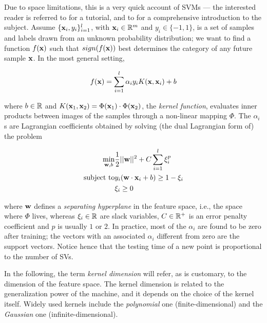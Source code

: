 Due to space limitations, this is a very quick account of SVMs --- the
interested reader is referred to \cite{Burges98} for a tutorial, and
to \cite{Cristianini00} for a comprehensive introduction to the
subject. Assume $\{\mathbf{x}_i,y_i\}_{i=1}^l$, with $\mathbf{x}_i \in \mathbb{R}^m$ and
$y_i \in \{-1,1\}$, is a set of samples and labels drawn from an
unknown probability distribution; we want to find a function $f(\mathbf{x})$
such that $sign(f(\mathbf{x}))$ best determines the category of any future
sample $\mathbf{x}$. In the most general setting,

\begin{equation} \label{eqn:sol}
  f(\mathbf{x}) = \sum_{i=1}^l \alpha_i y_i K(\mathbf{x},\mathbf{x}_i) + b
\end{equation}

\noindent where $b \in \mathbb{R}$ and $K(\mathbf{x}_1,\mathbf{x}_2) = \Phi(\mathbf{x}_1)
\cdot \Phi(\mathbf{x}_2)$, the \emph{kernel function}, evaluates inner
products between images of the samples through a non-linear mapping
$\Phi$. The $\alpha_i$s are Lagrangian coefficients obtained by
solving (the dual Lagrangian form of) the problem

\begin{eqnarray} \label{eqn:svm_primal}
  \min_{\mathbf{w},b}      & \frac{1}{2} ||\mathbf{w}||^2 + C \sum_{i=1}^l \xi_i^p \\
  \mbox{subject to} & y_i (\mathbf{w}\cdot\mathbf{x}_i + b) \geq 1-\xi_i            \nonumber \\
                    & \xi_i \geq 0                                    \nonumber
\end{eqnarray}

\noindent where $\mathbf{w}$ defines a \emph{separating hyperplane}
in the feature space, i.e., the space where $\Phi$ lives, whereas
$\xi_i \in \mathbb{R}$ are slack variables, $C \in \mathbb{R}^+$ is an error penalty
coefficient and $p$ is usually $1$ or $2$. In practice, most of the
$\alpha_i$ are found to be zero after training; the vectors with an
associated $\alpha_i$ different from zero are the support
vectors. Notice hence that the testing time of a new point is
proportional to the number of SVs.

In the following, the term \emph{kernel dimension} will refer, as is
customary, to the dimension of the feature space. The kernel dimension
is related to the generalization power of the machine, and it depends
on the choice of the kernel itself. Widely used kernels include the
\emph{polynomial} one (finite-dimensional) and the \emph{Gaussian} one
(infinite-dimensional).
